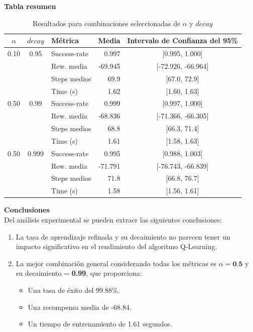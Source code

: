 \newpage
\textbf{Tabla resumen}

\begin{table}[H]
    \centering
    \begin{tabular}{|c|c|l|r|c|}
    \hline
    $\alpha$ & $decay$ & Métrica        & Media    & Intervalo de Confianza del 95\% \\
    \hline
    0.10 & 0.95 & Success-rate  & 0.997   & [0.995, 1.000] \\
         &      & Rew. media    & -69.945 & [-72.926, -66.964] \\
         &      & Steps medios  & 69.9    & [67.0, 72.9] \\
         &      & Time (s)      & 1.62    & [1.60, 1.63] \\
    \hline
    0.50 & 0.99 & Success-rate  & 0.999   & [0.997, 1.000] \\
         &      & Rew. media    & -68.836 & [-71.366, -66.305] \\
         &      & Steps medios  & 68.8    & [66.3, 71.4] \\
         &      & Time (s)      & 1.61    & [1.58, 1.63] \\
    \hline
    0.50 & 0.999 & Success-rate  & 0.995   & [0.988, 1.003] \\
         &       & Rew. media    & -71.791 & [-76.743, -66.839] \\
         &       & Steps medios  & 71.8    & [66.8, 76.7] \\
         &       & Time (s)      & 1.58    & [1.56, 1.61] \\
    \hline
    \end{tabular}
    \caption{Resultados para combinaciones seleccionadas de $\alpha$ y $decay$}
    \label{tab:resultados_seleccionados}
\end{table}

    
    

\textbf{Conclusiones}
\\

Del análisis experimental se pueden extraer las siguientes conclusiones:

\begin{enumerate}
    \item La tasa de aprendizaje refinada y su decaimiento no parecen tener un impacto significativo en el rendimiento del algoritmo Q-Learning.
    \item La mejor combinación general considerando todas los métricas es $\alpha = \textbf{0.5}$ y su decaimiento = \textbf{0.99}, que proporciona:
    \begin{itemize}
        \item Una tasa de éxito del 99.88\%.
        \item Una recompensa media de -68.84.
        \item Un tiempo de entrenamiento de 1.61 segundos.
    \end{itemize}
\end{enumerate}

